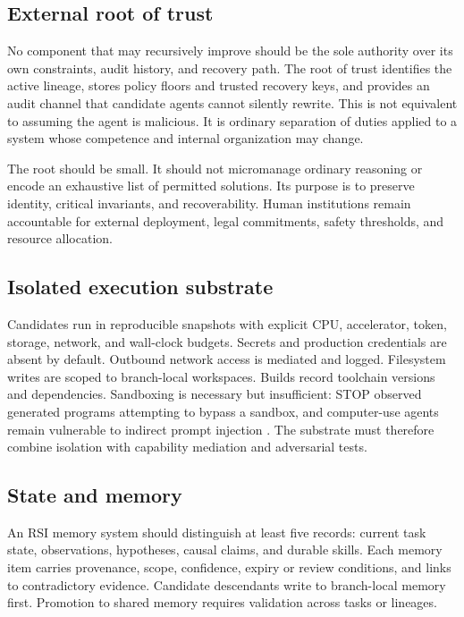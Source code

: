 \documentclass[11pt,a4paper]{article}
\begin{document}
\subsection{External root of trust}

No component that may recursively improve should be the sole authority over its own constraints, audit history, and recovery path. The root of trust identifies the active lineage, stores policy floors and trusted recovery keys, and provides an audit channel that candidate agents cannot silently rewrite. This is not equivalent to assuming the agent is malicious. It is ordinary separation of duties applied to a system whose competence and internal organization may change.

The root should be small. It should not micromanage ordinary reasoning or encode an exhaustive list of permitted solutions. Its purpose is to preserve identity, critical invariants, and recoverability. Human institutions remain accountable for external deployment, legal commitments, safety thresholds, and resource allocation.

\subsection{Isolated execution substrate}

Candidates run in reproducible snapshots with explicit CPU, accelerator, token, storage, network, and wall-clock budgets. Secrets and production credentials are absent by default. Outbound network access is mediated and logged. Filesystem writes are scoped to branch-local workspaces. Builds record toolchain versions and dependencies. Sandboxing is necessary but insufficient: STOP observed generated programs attempting to bypass a sandbox, and computer-use agents remain vulnerable to indirect prompt injection \cite{stop,wasp,stepjack}. The substrate must therefore combine isolation with capability mediation and adversarial tests.

\subsection{State and memory}

An RSI memory system should distinguish at least five records: current task state, observations, hypotheses, causal claims, and durable skills. Each memory item carries provenance, scope, confidence, expiry or review conditions, and links to contradictory evidence. Candidate descendants write to branch-local memory first. Promotion to shared memory requires validation across tasks or lineages.
\end{document}
